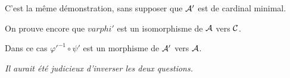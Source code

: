 \begin{Exercise}
C'est la même démonstration, sans supposer que ${\cal A}'$ est de cardinal minimal.

On prouve encore que $varphi'$ est un isomorphisme de ${\cal A}$ vers ${\cal C}$.

Dans ce cas $\varphi'^{-1}\circ \psi'$ est un morphisme de ${\cal A}'$ vers ${\cal A}$.

{\it Il aurait été judicieux d'inverser les deux questions.}
\end{Exercise}
\newpage
